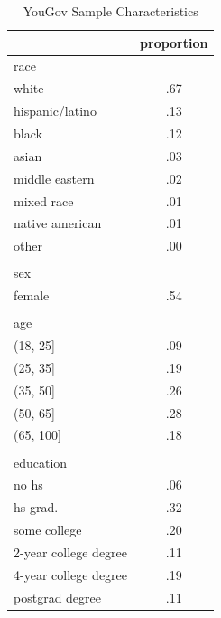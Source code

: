 \documentclass[sigconf]{acmart}
\begin{document}
\begin{table}[h!]
\centering
\caption{YouGov Sample Characteristics}
\begin{tabular}{ l c }
\hline    
 & proportion \\
\hline
race   & \\
\hspace{2mm}white            &  .67\\
\hspace{2mm}hispanic/latino  &  .13\\
\hspace{2mm}black            &  .12\\
\hspace{2mm}asian            &  .03\\
\hspace{2mm}middle eastern   &  .02\\
\hspace{2mm}mixed race       &  .01\\
\hspace{2mm}native american  &  .01\\
\hspace{2mm}other            &  .00\\
& \\
sex & \\
\hspace{2mm}female           &  .54\\
& \\
age & \\
\hspace{2mm}(18, 25]     & .09 \\
\hspace{2mm}(25, 35]     & .19 \\
\hspace{2mm}(35, 50]     & .26 \\
\hspace{2mm}(50, 65]     & .28 \\
\hspace{2mm}(65, 100]    & .18 \\
& \\
education & \\
\hspace{2mm}no hs                 &   .06\\
\hspace{2mm}hs grad.            &     .32\\
\hspace{2mm}some college        &     .20\\
\hspace{2mm}2-year college degree &   .11\\
\hspace{2mm}4-year college degree &   .19\\
\hspace{2mm}postgrad degree       &   .11\\
\hline
\end{tabular}
\label{table:yg_dat}
\end{table}
\end{document}
